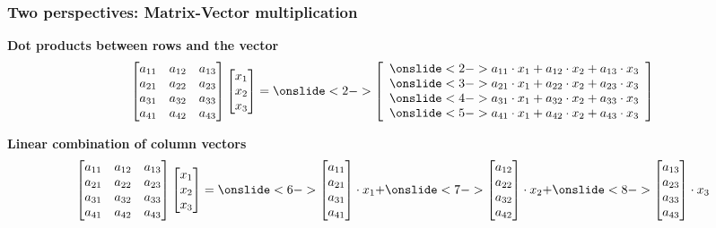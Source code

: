 \begin{frame}
  \frametitle{Two perspectives: Matrix-Vector multiplication}

  {\bf Dot products between rows and the vector}
  \[
  \begin{bmatrix}
    a_{11} & a_{12} & a_{13} \\
    a_{21} & a_{22} & a_{23} \\
    a_{31} & a_{32} & a_{33} \\
    a_{41} & a_{42} & a_{43}
  \end{bmatrix}
  \begin{bmatrix}
    x_1 \\
    x_2 \\
    x_3 
  \end{bmatrix}
  =
  \onslide<2->{
    \left[
      \begin{array}{c}
        \onslide<2->{a_{11}\cdot x_1 + a_{12}\cdot x_2 + a_{13}\cdot x_3} \\
        \onslide<3->{a_{21}\cdot x_1 + a_{22}\cdot x_2 + a_{23}\cdot x_3} \\
        \onslide<4->{a_{31}\cdot x_1 + a_{32}\cdot x_2 + a_{33}\cdot x_3} \\
        \onslide<5->{a_{41}\cdot x_1 + a_{42}\cdot x_2 + a_{43}\cdot x_3} 
      \end{array}
      \right]
  }
  \]

  {\bf Linear combination of column vectors}
  \[
  \begin{bmatrix}
    a_{11} & a_{12} & a_{13} \\
    a_{21} & a_{22} & a_{23} \\
    a_{31} & a_{32} & a_{33} \\
    a_{41} & a_{42} & a_{43}
  \end{bmatrix}
  \begin{bmatrix}
    x_1 \\
    x_2 \\
    x_3 
  \end{bmatrix}
  =
  \onslide<6->{
  \begin{bmatrix}
    a_{11} \\
    a_{21} \\
    a_{31} \\
    a_{41}
  \end{bmatrix}
  \cdot x_1
  +
  }
  \onslide<7->{
  \begin{bmatrix}
    a_{12} \\
    a_{22} \\
    a_{32} \\
    a_{42}
  \end{bmatrix}
  \cdot x_2
  +
  }
  \onslide<8->{
  \begin{bmatrix}
    a_{13} \\
    a_{23} \\
    a_{33} \\
    a_{43}
  \end{bmatrix}
  \cdot x_3
  }
  \]


\end{frame}
